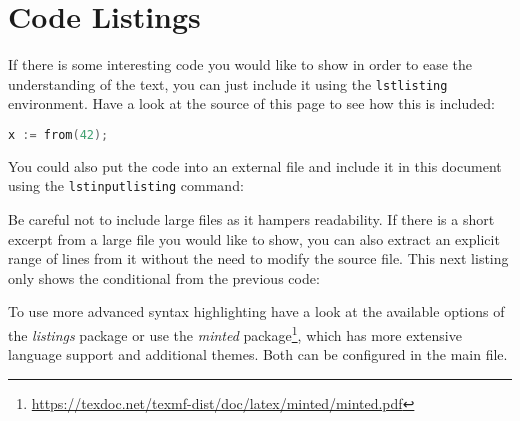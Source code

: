 \section{Code Listings}

If there is some interesting code you would like to show
in order to ease the understanding of the text,
you can just include it using the \verb+lstlisting+ environment.
Have a look at the source of this page to see how this is included:

\begin{lstlisting}[language=Go]
x := from(42);
\end{lstlisting}

You could also put the code into an external file
and include it in this document using the \verb+lstinputlisting+ command:



Be careful not to include large files as it hampers readability.
If there is a short excerpt from a large file you would like to show,
you can also extract an explicit range of lines from it without the need to modify the source file.
This next listing only shows the conditional from the previous code:



To use more advanced syntax highlighting
have a look at the available options of the \emph{listings} package
or use the \emph{minted} package\footnote{\url{https://texdoc.net/texmf-dist/doc/latex/minted/minted.pdf}},
which has more extensive language support and additional themes.
Both can be configured in the main file.

